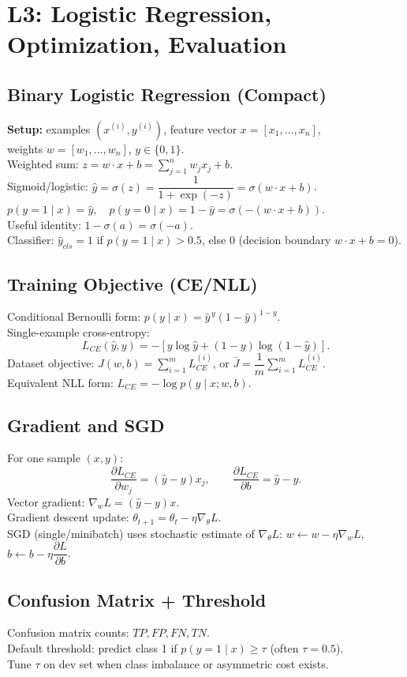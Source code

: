\section{L3: Logistic Regression, Optimization, Evaluation}
\subsection*{Binary Logistic Regression (Compact)}
\textbf{Setup:} examples $(x^{(i)},y^{(i)})$, feature vector $x=[x_1,\ldots,x_n]$,\\
weights $w=[w_1,\ldots,w_n]$, $y\in\{0,1\}$.\\
Weighted sum: $z=w\cdot x+b=\sum_{j=1}^{n}w_jx_j+b$.\\
Sigmoid/logistic: $\hat y=\sigma(z)=\dfrac{1}{1+\exp(-z)}=\sigma(w\cdot x+b)$.\\
$p(y=1\mid x)=\hat y,\quad p(y=0\mid x)=1-\hat y=\sigma(-(w\cdot x+b))$.\\
Useful identity: $1-\sigma(a)=\sigma(-a)$.\\
Classifier: $\hat y_{cls}=1$ if $p(y=1\mid x)>0.5$, else $0$ (decision boundary $w\cdot x+b=0$).

\subsection*{Training Objective (CE/NLL)}
Conditional Bernoulli form: $p(y\mid x)=\hat y^{\,y}(1-\hat y)^{1-y}$.\\
Single-example cross-entropy:
\[
L_{CE}(\hat y,y)=-\left[y\log\hat y+(1-y)\log(1-\hat y)\right].
\]
Dataset objective: $J(w,b)=\sum_{i=1}^{m}L_{CE}^{(i)}$, or $\bar J=\dfrac{1}{m}\sum_{i=1}^{m}L_{CE}^{(i)}$.\\
Equivalent NLL form: $L_{CE}=-\log p(y\mid x;w,b)$.

\subsection*{Gradient and SGD}
For one sample $(x,y)$:
\[
\frac{\partial L_{CE}}{\partial w_j}=(\hat y-y)x_j,\qquad
\frac{\partial L_{CE}}{\partial b}=\hat y-y.
\]
Vector gradient: $\nabla_wL=(\hat y-y)x$.\\
Gradient descent update: $\theta_{t+1}=\theta_t-\eta\nabla_\theta L$.\\
SGD (single/minibatch) uses stochastic estimate of $\nabla_\theta L$:
$w\leftarrow w-\eta\nabla_wL$, $b\leftarrow b-\eta\dfrac{\partial L}{\partial b}$.

\subsection*{Confusion Matrix + Threshold}
Confusion matrix counts: $TP,FP,FN,TN$.\\
Default threshold: predict class 1 if $p(y=1\mid x)\ge\tau$ (often $\tau=0.5$).\\
Tune $\tau$ on dev set when class imbalance or asymmetric cost exists.

